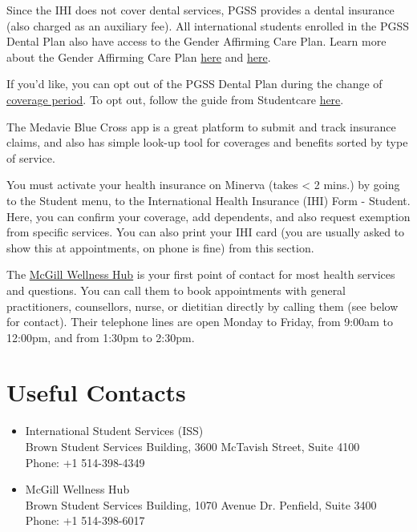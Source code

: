 Since the IHI does not cover dental services, PGSS provides a dental insurance (also charged as an auxiliary fee). All international students enrolled in the PGSS Dental Plan also have access to the Gender Affirming Care Plan. Learn more about the Gender Affirming Care Plan \href{https://studentcare.ca/rte/en/McGillUniversitygraduatestudentsPGSS_LGBTQIA2SSupport}{here} and \href{https://studentcare.ca/RTEContent/Document/GAC/GAC-Eng_1SEPT2025.pdf}{here}. 

If you'd like, you can opt out of the PGSS Dental Plan during the change of  \href{https://studentcare.ca/rte/en/McGillUniversitygraduatestudentsPGSS_ChangeofCoverage_ChangeofCoveragePeriod}{coverage period}. To opt out, follow the guide from Studentcare \href{https://studentcare.ca/rte/en/ProofofCoverage}{here}.

\begin{plaincorollary}
    The Medavie Blue Cross app is a great platform to submit and track insurance claims, and also has simple look-up tool for coverages and benefits sorted by type of service.
\end{plaincorollary}

You must activate your health insurance on Minerva (takes < 2 mins.) by going to the Student menu, to the International Health Insurance (IHI) Form - Student. Here, you can confirm your coverage, add dependents, and also request exemption from specific services. You can also print your IHI card (you are usually asked to show this at appointments, on phone is fine) from this section.

The \href{https://www.mcgill.ca/wellness-hub/}{McGill Wellness Hub} is your first point of contact for most health services and questions. You can call them to book appointments with general practitioners, counsellors, nurse, or dietitian directly by calling them (see below for contact). Their telephone lines are open Monday to Friday, from 9:00am to 12:00pm, and from 1:30pm to 2:30pm. 




\section{Useful Contacts}
\begin{itemize}
    \item International Student Services (ISS) \\
    Brown Student Services Building, 3600 McTavish Street, Suite 4100 \\
    Phone: +1 514-398-4349
    
    \item McGill Wellness Hub \\
    Brown Student Services Building, 1070 Avenue Dr. Penfield, Suite 3400 \\
    Phone: +1 514-398-6017


\end{itemize}